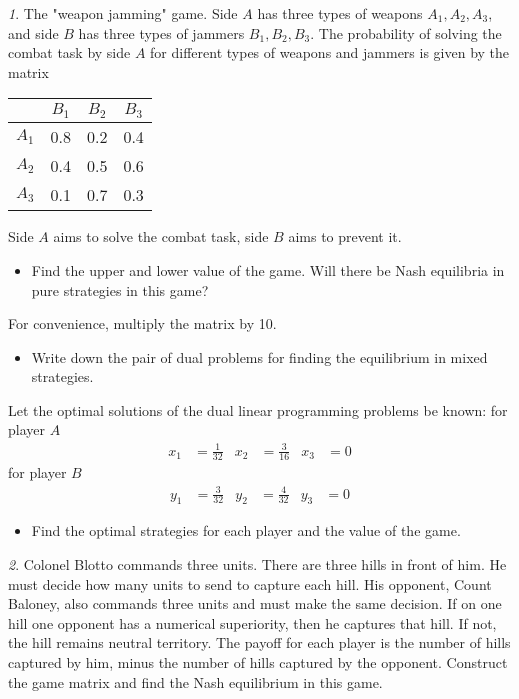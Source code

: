 \documentclass[12pt]{article}
\theoremstyle{remark}
\newtheorem{exercise}{}[subsection]
\begin{document}
\begin{exercise}
The "weapon jamming" game. Side $A$ has three types of weapons
$A_1,A_2,A_3$, and side $B$ has three types of jammers $B_1,B_2,B_3$. The probability of solving
the combat task by side $A$ for different types of weapons and jammers is given by the matrix
\begin{center}
	\begin{tabular}{|c|c|c|c|}\hline
	& $B_1$ & $B_2$ & $B_3$ \\ \hline
	$A_1$ & 0.8 & 0.2 & 0.4 \\ \hline
	$A_2$ & 0.4 & 0.5 & 0.6 \\ \hline
	$A_3$ & 0.1 & 0.7 & 0.3 \\ \hline
	\end{tabular}
\end{center}
Side $A$ aims to solve the combat task, side $B$ aims to prevent it.
\begin{itemize}
	\item Find the upper and lower value of the game. Will there be Nash equilibria
	in pure strategies in this game?
\end{itemize}
For convenience, multiply the matrix by 10.
\begin{itemize}
	\item Write down the pair of dual problems for finding the equilibrium in mixed strategies.
\end{itemize}
Let the optimal solutions of the dual linear programming problems be known:
for player $A$
\begin{align*}
	x_1&=\frac{1}{32} & x_2&=\frac{3}{16} & x_3&=0
\end{align*}
for player $B$
\begin{align*}
	y_1&=\frac{3}{32} & y_2&=\frac{4}{32} & y_3&=0
\end{align*}
\begin{itemize}
	\item Find the optimal strategies for each player and the value of the game.
\end{itemize}
\end{exercise}

\begin{exercise}
Colonel Blotto commands three units. There are three hills in front of him.
He must decide how many units to send to capture each hill.
His opponent, Count Baloney, also commands three units and must make the same decision.
If on one hill one opponent has a numerical superiority, then he captures that hill.
If not, the hill remains neutral territory.
The payoff for each player is the number of hills captured by him,
minus the number of hills captured by the opponent.
Construct the game matrix and find the Nash equilibrium in this game.
\end{exercise}
\end{document}
